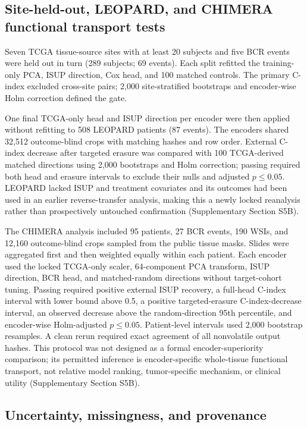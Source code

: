 \subsection{Site-held-out, LEOPARD, and CHIMERA functional transport tests}

Seven TCGA tissue-source sites with at least 20 subjects and five BCR events were held out in
turn (289 subjects; 69 events). Each split refitted the training-only PCA, ISUP direction, Cox
head, and 100 matched controls. The primary C-index excluded cross-site pairs; 2,000
site-stratified bootstraps and encoder-wise Holm correction defined the gate.

One final TCGA-only head and ISUP direction per encoder were then applied without refitting to
508 LEOPARD patients (87 events). The encoders shared 32,512 outcome-blind crops with matching
hashes and row order. External C-index decrease after targeted erasure was compared with 100
TCGA-derived matched directions using 2,000 bootstraps and Holm correction; passing required
both head and erasure intervals to exclude their nulls and adjusted $p\leq0.05$. LEOPARD lacked
ISUP and treatment covariates and its outcomes had been used in an earlier reverse-transfer
analysis, making this a newly locked reanalysis rather than prospectively untouched confirmation
(Supplementary Section S5B).

The CHIMERA analysis included 95 patients, 27 BCR events, 190 WSIs, and 12,160
outcome-blind crops sampled from the public tissue masks. Slides were aggregated first and then
weighted equally within each patient. Each encoder used the locked TCGA-only scaler, 64-component
PCA transform, ISUP direction, BCR head, and matched-random directions without target-cohort
tuning. Passing required positive external ISUP recovery, a full-head C-index interval with lower
bound above 0.5, a positive targeted-erasure C-index-decrease interval, an observed decrease above
the random-direction 95th percentile, and encoder-wise Holm-adjusted $p\leq0.05$. Patient-level
intervals used 2,000 bootstrap resamples. A clean rerun required exact agreement of all
nonvolatile output hashes. This protocol was not designed as a formal encoder-superiority
comparison; its permitted inference is encoder-specific whole-tissue functional transport, not
relative model ranking, tumor-specific mechanism, or clinical utility (Supplementary Section
S5B).

\subsection{Uncertainty, missingness, and provenance}

